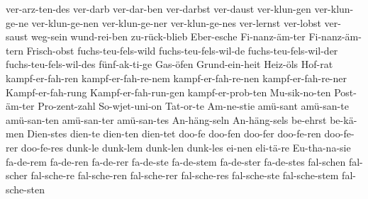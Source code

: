 {  ver-arz-ten-des %
  ver-darb %
  ver-dar-ben %
  ver-darbst %
  ver-daust %
  ver-klun-gen %
  ver-klun-ge-ne %
  ver-klun-ge-nen %
  ver-klun-ge-ner %
  ver-klun-ge-nes %
  ver-lernst %
  ver-lobst %
  ver-saust %
  weg-sein %
  wund-rei-ben %
  zu-r^^fcck-blieb %
%
%
%
  Eber-esche %
  Fi-nanz-^^e4m-ter %
  Fi-nanz-^^e4m-tern %
  Frisch-obst %
  fuchs-teu-fels-wild %
  fuchs-teu-fels-wil-de %
  fuchs-teu-fels-wil-der %
  fuchs-teu-fels-wil-des %
  f^^fcnf-ak-ti-ge %
  Gas-^^f6fen %
  Grund-ein-heit %
  Heiz-^^f6ls %
  Hof-rat %
  kampf-er-fah-ren %
  kampf-er-fah-re-nem %
  kampf-er-fah-re-nen %
  kampf-er-fah-re-ner %
  Kampf-er-fah-rung %
  Kampf-er-fah-run-gen %
  kampf-er-prob-ten %
  Mu-sik-no-ten %
  Post-^^e4m-ter %
  Pro-zent-zahl %
  So-wjet-uni-on %
  Tat-or-te %
%
%
%
  Am-ne-stie %
  am^^fc-sant %
  am^^fc-san-te %
  am^^fc-san-ten %
  am^^fc-san-ter %
  am^^fc-san-tes %
  An-h^^e4ng-seln %
  An-h^^e4ng-sels %
  be-ehrst %
  be-k^^e4-men %
  Dien-stes %
  dien-te %
  dien-ten %
  dien-tet %
  doo-fe %
  doo-fen %
  doo-fer %
  doo-fe-ren %
  doo-fe-rer %
  doo-fe-res %
  dunk-le %
  dunk-lem %
  dunk-len %
  dunk-les %
  ei-nen %
  eli-t^^e4-re %
  Eu-tha-na-sie %
  fa-de-rem %
  fa-de-ren %
  fa-de-rer %
  fa-de-ste %
  fa-de-stem %
  fa-de-ster %
  fa-de-stes %
  fal-schen %
  fal-scher %
  fal-sche-re %
  fal-sche-ren %
  fal-sche-rer %
  fal-sche-res %
  fal-sche-ste %
  fal-sche-stem %
  fal-sche-sten %
}
